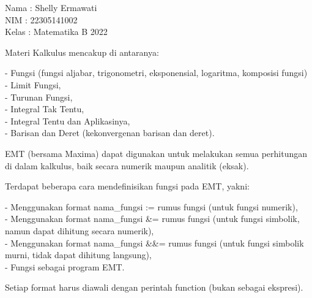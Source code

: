 \documentclass{article}
\begin{document}
\begin{eulernotebook}
\begin{eulercomment}
Nama  : Shelly Ermawati\\
NIM   : 22305141002\\
Kelas : Matematika B 2022


\begin{eulercomment}
\begin{eulercomment}
Materi Kalkulus mencakup di antaranya:

- Fungsi (fungsi aljabar, trigonometri, eksponensial, logaritma,
komposisi fungsi)\\
- Limit Fungsi,\\
- Turunan Fungsi,\\
- Integral Tak Tentu,\\
- Integral Tentu dan Aplikasinya,\\
- Barisan dan Deret (kekonvergenan barisan dan deret).

EMT (bersama Maxima) dapat digunakan untuk melakukan semua perhitungan
di dalam kalkulus, baik secara numerik maupun analitik (eksak).

\end{eulercomment}
\begin{eulercomment}
Terdapat beberapa cara mendefinisikan fungsi pada EMT, yakni:

- Menggunakan format nama\_fungsi := rumus fungsi (untuk fungsi
numerik),\\
- Menggunakan format nama\_fungsi \&= rumus fungsi (untuk fungsi
simbolik, namun dapat dihitung secara numerik),\\
- Menggunakan format nama\_fungsi \&\&= rumus fungsi (untuk fungsi
simbolik murni, tidak dapat dihitung langsung),\\
- Fungsi sebagai program EMT.

Setiap format harus diawali dengan perintah function (bukan sebagai
ekspresi).


\end{eulercomment}
\end{eulercomment}
\end{eulercomment}
\end{eulernotebook}
\end{document}
